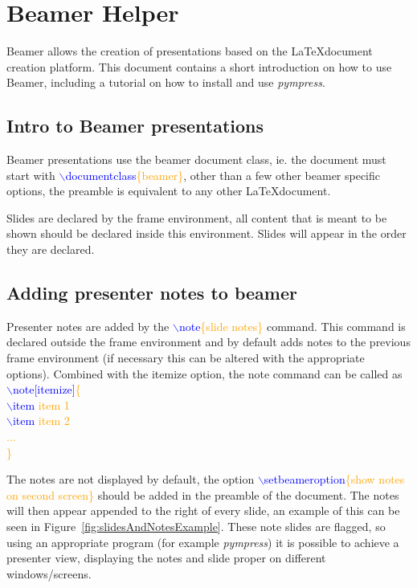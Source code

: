 \chapter{Beamer Helper}

Beamer allows the creation of presentations based on the \LaTeX document creation platform. This document contains a short introduction on how to use Beamer, including a tutorial on how to install and use \textit{pympress}.

\section{Intro to Beamer presentations}

Beamer presentations use the beamer document class, ie. the document must start with 
\textcolor{blue}{$\backslash$documentclass}\textcolor{orange}{\{beamer\}},
other than a few other beamer specific options, the preamble is equivalent to any other \LaTeX document.
\par
Slides are declared by the frame environment, all content that is meant to be shown should be declared inside this environment. Slides will appear in the order they are declared.

\section{Adding presenter notes to beamer}

Presenter notes are added by the 
\textcolor{blue}{$\backslash$note}\textcolor{orange}{\{slide notes\}}
command. This command is declared outside the frame environment and by default adds notes to the previous frame environment (if necessary this can be altered with the appropriate options). Combined with the itemize option, the note command can be called as 
\\
\textcolor{blue}{$\backslash$note[itemize]}\textcolor{orange}{\{\\
\textcolor{blue}{$\backslash$item} item 1\\
\textcolor{blue}{$\backslash$item} item 2\\
...\\
\}}
\par
The notes are not displayed by default, the option \textcolor{blue}{$\backslash$setbeameroption}\textcolor{orange}{\{show notes on second screen\}}
should be added in the preamble of the document. The notes will then appear appended to the right of every slide, an example of this can be seen in Figure~\ref{fig:slidesAndNotesExample}. These note slides are flagged, so using an appropriate program (for example \textit{pympress}) it is possible to achieve a presenter view, displaying the notes and slide proper on different windows/screens.

